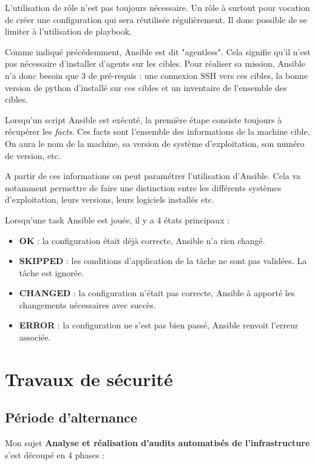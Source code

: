 \documentclass[12pt]{article}
\begin{document}
L'utilisation de rôle n'est pas toujours nécessaire. 
Un rôle à surtout pour vocation de créer une configuration qui sera réutilisée régulièrement. 
Il donc possible de se limiter à l'utilisation de playbook.

Comme indiqué précédemment, Ansible est dit "agentless". 
Cela signifie qu'il n'est pas nécessaire d'installer d'agents sur les cibles. 
Pour réaliser sa mission, Ansible n'a donc besoin que 3 de pré-requis :  une connexion SSH vers ces cibles, la bonne version de python d'installé sur ces cibles et un inventaire de l'ensemble des cibles.

Lorsqu'un script Ansible est exécuté, la première étape consiste toujours à récupérer les \textit{facts}. 
Ces facts sont l'ensemble des informations de la machine cible. 
On aura le nom de la machine, sa version de système d'exploitation, son numéro de version, etc.

A partir de ces informations on peut paramétrer l'utilisation d'Ansible. 
Cela va notamment permettre de faire une distinction entre les différents systèmes d'exploitation, leurs versions, leurs logiciels installés etc.

Lorsqu'une task Ansible est jouée, il y a 4 états principaux :
\begin{itemize}
    \item \textbf{OK} : la configuration était déjà correcte, Ansible n'a rien changé.
    \item \textbf{SKIPPED} : les conditions d'application de la tâche ne sont pas validées. La tâche est ignorée.
    \item \textbf{CHANGED} : la configuration n'était pas correcte, Ansible à apporté les changements nécessaires avec succès.
    \item \textbf{ERROR} : la configuration ne s'est pas bien passé, Ansible renvoit l'erreur associée.
\end{itemize}

\newpage
\section{Travaux de sécurité}
\subsection{Période d'alternance}
Mon sujet \textbf{Analyse et réalisation d'audits automatisés de l'infrastructure} s'est découpé en 4 phases :
\end{document}
